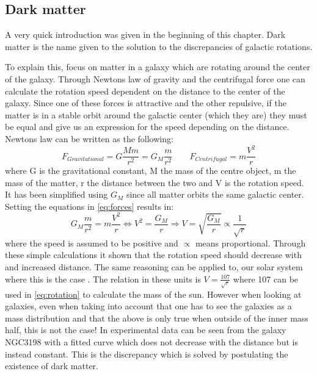 \subsection{Dark matter}\label{sec:tb:subsec:dark}
A very quick introduction was given in the beginning of this chapter. Dark matter is the name given to the solution to the discrepancies of galactic rotations. 


To explain this, focus on matter in a galaxy which are rotating around the center of the galaxy. Through Newtons law of gravity and the centrifugal force one can calculate the rotation speed dependent on the distance to the center of the galaxy. Since one of these forces is attractive and the other repulsive, if the matter is in a stable orbit around the galactic center (which they are) they must be equal and give us an expression for the speed depending on the distance. Newtons law can be written as the following:
\begin{equation}\label{eq:forces}
F_{Gravitational}=G \frac{M m}{r^2} = G_M \frac{m}{r^2} \qquad F_{Centrifugal} = m\frac{V^2}{r}
\end{equation}
where G is the gravitational constant, M the mass of the centre object, m the mass of the matter, r the distance between the two and V is the rotation speed. It has been simplified using $G_M$ since all matter orbits the same galactic center. Setting the equations in \eqref{eq:forces} results in:
\begin{equation}\label{eq:rotation}
G_M \frac{m}{r^2} = m\frac{V^2}{r} \Leftrightarrow V^2 =\frac{G_M}{r} \Rightarrow V=\sqrt{\frac{G_M}{r}} \propto \frac{1}{\sqrt{r}}
\end{equation}
where the speed is assumed to be positive and $\propto$ means proportional. Through these simple calculations it shown that the rotation speed should decrease with and increased distance. The same reasoning can be applied to, our solar system where this is the case . The relation in these units is $V=\frac{107}{\sqrt{r}}$ where 107 can be used in \eqref{eq:rotation} to calculate the mass of the sun. However when looking at galaxies, even when taking into account that one has to see the galaxies as a mass distribution and that the above is only true when outside of the inner mass half, this is not the case! In  experimental data can be seen from the galaxy NGC3198 with a fitted curve which does not decrease with the distance but is instead constant.  This is the discrepancy which is solved by postulating the existence of dark matter.
